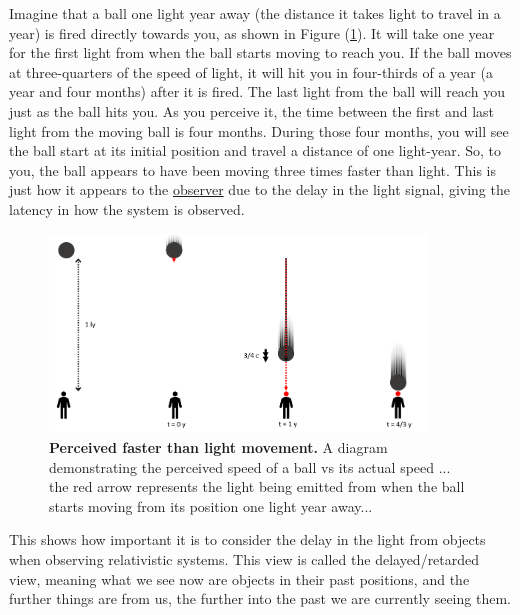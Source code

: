 Imagine that a ball one light year away (the distance it takes light to travel in a year) is fired directly towards you, as shown in Figure (\ref{fig: perceived vs actual speed}).
It will take one year for the first light from when the ball starts moving to reach you.
If the ball moves at three-quarters of the speed of light, it will hit you in four-thirds of a year (a year and four months) after it is fired.
The last light from the ball will reach you just as the ball hits you.
As you perceive it, the time between the first and last light from the moving ball is four months.
During those four months, you will see the ball start at its initial position and travel a distance of one light-year.
So, to you, the ball appears to have been moving three times faster than light.
This is just how it appears to the \hyperlink{def-observer}{observer} due to the delay in the light signal, giving the latency in how the system is observed.

\begin{figure}[H]
	\centering
	\includegraphics[width = 10cm]{images/pdf/Perceived_speed.pdf}
	\caption{\textbf{Perceived faster than light movement.} A diagram demonstrating the perceived speed of a ball vs its actual speed ... the red arrow represents the light being emitted from when the ball starts moving from its position one light year away...}
	\label{fig: perceived vs actual speed}
\end{figure}

This shows how important it is to consider the delay in the light from objects when observing relativistic systems.
This view is called the delayed/retarded view, meaning what we see now are objects in their past positions, and the further things are from us, the further into the past we are currently seeing them.


